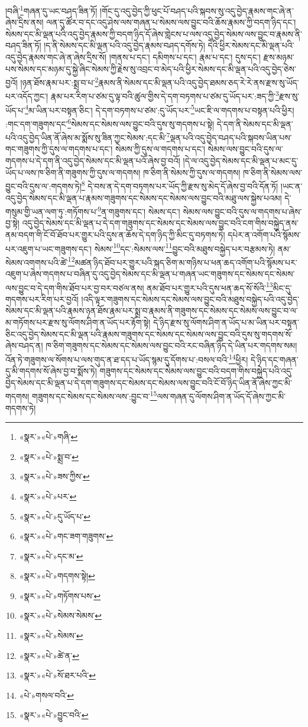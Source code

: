 །བཞི་\footnote{«སྣར་»«པེ་»གཞི་}གཞན་དུ་ཡང་བཤད་ཟིན་ཏོ། །གོང་དུ་འདུ་བྱེད་ཀྱི་ཕུང་པོ་བཤད་པའི་སྐབས་སུ་འདུ་བྱེད་རྣམས་གང་ཞེ་ན་ཞེས་དྲིས་ནས། ལན་དུ་ཚོར་བ་དང་འདུ་ཤེས་ལས་གཞན་པ་སེམས་ལས་བྱུང་བའི་ཆོས་རྣམས་ཀྱི་བདག་ཉིད་དང་། སེམས་དང་མི་ལྡན་པའི་འདུ་བྱེད་རྣམས་ཀྱི་བདག་ཉིད་དོ་ཞེས་གླེངས་པ་ལས་འདུ་བྱེད་སེམས་ལས་བྱུང་བ་རྣམས་ནི་བཤད་ཟིན་ཏོ། །ད་ནི་སེམས་དང་མི་ལྡན་པའི་འདུ་བྱེད་རྣམས་བཤད་དགོས་ཏེ། དེའི་ཕྱིར་སེམས་དང་མི་ལྡན་པའི་འདུ་བྱེད་རྣམས་གང་ཞེ་ན་ཞེས་དྲིས་སོ། །གནས་པ་དང་། དམིགས་པ་དང་། རྣམ་པ་དང་། དུས་དང་། རྫས་མཉམ་པས་སེམས་དང་མཉམ་དུ་སྐྱེ་ཞིང་སེམས་ཀྱི་རྗེས་སུ་འབྲང་བ་མེད་པའི་ཕྱིར་སེམས་དང་མི་ལྡན་པའི་འདུ་བྱེད་ཅེས་བྱའོ། །ཉན་ཐོས་རྣམ་པར་:སྨྲ་བ་པ་\footnote{«སྣར་»«པེ་»སྨྲ་བ་}རྣམས་ནི་སེམས་དང་མི་ལྡན་པའི་འདུ་བྱེད་ཐམས་ཅད་རེ་རེ་ནས་རྫས་སུ་ཡོད་པར་འདོད་ཀྱང་། རྣམ་པར་རིག་པ་ཙམ་དུ་ལྟ་བའི་ཚུལ་གྱིས་དེ་དག་བཏགས་པ་ཙམ་དུ་ཡོད་པར་:ཟད་ཀྱི་\footnote{«སྣར་»«པེ་»ཟས་ཀྱིས་}རྫས་སུ་ཡོད་པ་\footnote{«སྣར་»«པེ་»པར་}མ་ཡིན་པར་བསྟན་ཅིང་། དེ་དག་བཏགས་པ་ཙམ་:དུ་ཡོད་པར་\footnote{«སྣར་»«པེ་»དུ་ཡོད་པ་}ཡང་ཇི་ལ་གདགས་པ་བསྟན་པའི་ཕྱིར། :གང་དག་གཟུགས་དང་\footnote{«སྣར་»«པེ་»གང་ཟག་གཟུགས་}སེམས་དང་སེམས་ལས་བྱུང་བའི་དུས་སུ་གདགས་པ་སྟེ། དེ་དག་ནི་སེམས་དང་མི་ལྡན་པའི་འདུ་བྱེད་ཡིན་ནོ་ཞེས་མ་སྨོས་སུ་ཟིན་ཀྱང་སེམས་:དང་མི་\footnote{«སྣར་»«པེ་»དང་མ་}ལྡན་པའི་འདུ་བྱེད་བཤད་པའི་སྐབས་ཡིན་པས་གང་གཟུགས་ཀྱི་དུས་ལ་གདགས་པ་དང་། སེམས་ཀྱི་དུས་ལ་གདགས་པ་དང་། སེམས་ལས་བྱུང་བའི་དུས་ལ་གདགས་པ་དེ་དག་ནི་འདུ་བྱེད་སེམས་དང་མི་ལྡན་པའོ་ཞེས་བྱ་བའོ། །དེ་ལ་འདུ་བྱེད་སེམས་དང་མི་ལྡན་པ་མང་དུ་ཡོད་པ་ལས་ཁ་ཅིག་ནི་གཟུགས་ཀྱི་དུས་ལ་གདགས། ཁ་ཅིག་ནི་སེམས་ཀྱི་དུས་ལ་གདགས། ཁ་ཅིག་ནི་སེམས་ལས་བྱུང་བའི་དུས་ལ་:གདགས་ཏེ།\footnote{«སྣར་»«པེ་»གདགས་སྟེ།} དེ་བས་ན་དེ་དག་བཏགས་པར་ཡོད་ཀྱི་རྫས་སུ་མེད་དོ་ཞེས་བྱ་བའི་དོན་ཏོ། །ཡང་ན་འདུ་བྱེད་སེམས་དང་མི་ལྡན་པ་རྣམས་གཟུགས་དང་སེམས་དང་སེམས་ལས་བྱུང་བའི་མཐུ་ལས་སྐྱེས་པའམ། དེ་གསུམ་གྱི་ཡན་ལག་ཏུ་:གཏོགས་པ་\footnote{«སྣར་»«པེ་»གཏོགས་པས་}ན་གཟུགས་དང་། སེམས་དང་། སེམས་ལས་བྱུང་བའི་དུས་ལ་གདགས་པ་ཞེས་བྱ་སྟེ། འདུ་བྱེད་སེམས་དང་མི་ལྡན་པ་དེ་དག་གཟུགས་དང་སེམས་དང་སེམས་ལས་བྱུང་བའི་ངག་གིས་བསྐྱེད་ནས་ནམ་བདག་གི་ངོ་བོ་ཐོབ་པར་གྱུར་པའི་དུས་ན་ཆོས་དེ་དག་ཉིད་ཀྱི་མིང་དུ་བཏགས་ཏེ། དཔེར་ན་འགོག་པའི་སྙོམས་པར་འཇུག་པ་ཡང་གཟུགས་དང་། སེམས་\footnote{«སྣར་»«པེ་»སེམས་སེམས་}དང་:སེམས་ལས་\footnote{«སྣར་»«པེ་»སེམས་}བྱུང་བའི་མཐུས་བསྐྱེད་པར་བརྩམས་ཏེ། ནམ་སེམས་འགགས་པའི་ཚེ་\footnote{«སྣར་»«པེ་»ཚེ་ན་}མཚན་ཉིད་ཐོབ་པར་གྱུར་པའི་སྐད་ཅིག་མ་གཉིས་པ་ཕན་ཆད་འགོག་པའི་སྙོམས་པར་འཇུག་པ་ཞེས་གདགས་པ་བཞིན་དུ་འདུ་བྱེད་སེམས་དང་མི་ལྡན་པ་གཞན་ཡང་གཟུགས་དང་སེམས་དང་སེམས་ལས་བྱུང་བ་དེ་དག་གིས་ཐོབ་པར་བྱ་བར་བཙལ་ནས། ནམ་ཐོབ་པར་གྱུར་པའི་དུས་ཕན་ཆད་སོ་སོའི་\footnote{«སྣར་»«པེ་»སོ་ཐར་པའི་}མིང་དུ་གདགས་པར་རིག་པར་བྱའོ། །འདི་ལྟར་གཟུགས་དང་སེམས་དང་སེམས་ལས་བྱུང་བའི་མཐུས་བསྐྱེད་པའི་འདུ་བྱེད་སེམས་དང་མི་ལྡན་པའི་རྣམས་ཉན་ཐོས་རྣམ་པར་སྨྲ་བ་རྣམས་ནི་གཟུགས་དང་སེམས་དང་སེམས་ལས་བྱུང་བ་ལ་མ་གཏོགས་པར་རྫས་སུ་ལོགས་ཤིག་ན་ཡོད་པར་རྟོག་སྟེ། དེ་ཉིད་རྫས་སུ་ལོགས་ཤིག་ན་ཡོད་པ་མ་ཡིན་པར་བསྟན་ཅིང་འདུ་བྱེད་སེམས་དང་མི་ལྡན་པའི་རྣམས་གཟུགས་དང་སེམས་དང་སེམས་ལས་བྱུང་བའི་དུས་སུ་གདགས་སོ་ཞེས་བཤད་ན། ཁ་ཅིག་གཟུགས་དང་སེམས་དང་སེམས་ལས་བྱུང་བའི་རང་བཞིན་ཉིད་དེ་ཡིན་པར་གདགས་སམ། འོན་ཏེ་གཟུགས་ལ་སོགས་པ་ལས་གུད་ན་ཐ་དད་པ་ཡོད་སྙམ་དུ་དོགས་པ་:བསལ་བའི་\footnote{«པེ་»གསལ་བའི་}ཕྱིར། དེ་ཉིད་དང་གཞན་དུ་མི་གདགས་སོ་ཞེས་བྱ་བ་སྨོས་ཏེ། གཟུགས་དང་སེམས་དང་སེམས་ལས་བྱུང་བའི་བདག་གིས་བསྐྱེད་པའི་འདུ་བྱེད་སེམས་དང་མི་ལྡན་པ་དེ་དག་གཟུགས་དང་སེམས་དང་སེམས་ལས་བྱུང་བའི་ངོ་བོ་ཉིད་ཡིན་ནོ་ཞེས་ཀྱང་མི་གདགས། གཟུགས་དང་སེམས་དང་སེམས་ལས་:བྱུང་བ་\footnote{«སྣར་»«པེ་»བྱུང་བའི་}ལས་གཞན་དུ་ལོགས་ཤིག་ན་ཡོད་དོ་ཞེས་ཀྱང་མི་གདགས་ཏེ། 